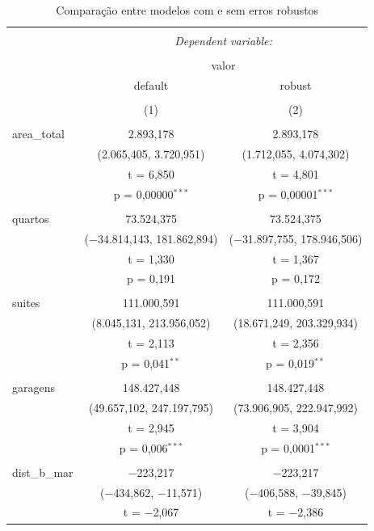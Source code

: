 \documentclass[a4paper]{article}
\begin{document}
\begin{table}[!htbp] \centering 
  \caption{Comparação entre modelos com e sem erros robustos} 
  \label{tab:tabela2} 
\begin{tabular}{@{\extracolsep{5pt}}lcc} 
\\[-1.8ex]\hline 
\hline \\[-1.8ex] 
 & \multicolumn{2}{c}{\textit{Dependent variable:}} \\ 
\cline{2-3} 
\\[-1.8ex] & \multicolumn{2}{c}{valor} \\ 
 & default & robust \\ 
\\[-1.8ex] & (1) & (2)\\ 
\hline \\[-1.8ex] 
 area\_total & 2.893,178 & 2.893,178 \\ 
  & (2.065,405, 3.720,951) & (1.712,055, 4.074,302) \\ 
  & t = 6,850 & t = 4,801 \\ 
  & p = 0,00000$^{***}$ & p = 0,00001$^{***}$ \\ 
  & & \\ 
 quartos & 73.524,375 & 73.524,375 \\ 
  & ($-$34.814,143, 181.862,894) & ($-$31.897,755, 178.946,506) \\ 
  & t = 1,330 & t = 1,367 \\ 
  & p = 0,191 & p = 0,172 \\ 
  & & \\ 
 suites & 111.000,591 & 111.000,591 \\ 
  & (8.045,131, 213.956,052) & (18.671,249, 203.329,934) \\ 
  & t = 2,113 & t = 2,356 \\ 
  & p = 0,041$^{**}$ & p = 0,019$^{**}$ \\ 
  & & \\ 
 garagens & 148.427,448 & 148.427,448 \\ 
  & (49.657,102, 247.197,795) & (73.906,905, 222.947,992) \\ 
  & t = 2,945 & t = 3,904 \\ 
  & p = 0,006$^{***}$ & p = 0,0001$^{***}$ \\ 
  & & \\ 
 dist\_b\_mar & $-$223,217 & $-$223,217 \\ 
  & ($-$434,862, $-$11,571) & ($-$406,588, $-$39,845) \\ 
  & t = $-$2,067 & t = $-$2,386 \\ 

\end{tabular}
\end{table}
\end{document}
